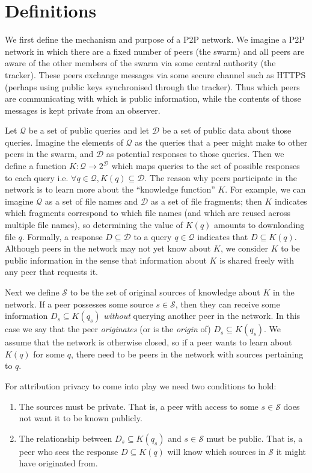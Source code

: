 \documentclass{article}
\begin{document}
\section{Definitions}\label{sec:defn}

We first define the mechanism and purpose of a P2P network. We imagine a P2P
network in which there are a fixed number of peers (the swarm) and all peers are
aware of the other members of the swarm via some central authority (the
tracker). These peers exchange messages via some secure channel such as HTTPS
(perhaps using public keys synchronised through the tracker). Thus which peers
are communicating with which is public information, while the contents of those
messages is kept private from an observer.

Let $\mathcal{Q}$ be a set of public queries and let $\mathcal{D}$ be a set of
public data about those queries. Imagine the elements of $\mathcal{Q}$ as the
queries that a peer might make to other peers in the swarm, and $\mathcal{D}$ as
potential responses to those queries. Then we define a function
$K:\mathcal{Q}\rightarrow 2^\mathcal{D}$ which maps queries to the set of
possible responses to each query i.e. $\forall q\in\mathcal{Q},
K(q)\subseteq\mathcal{D}$. The reason why peers participate in the network is to
learn more about the ``knowledge function'' $K$. For example, we can imagine
$\mathcal{Q}$ as a set of file names and $\mathcal{D}$ as a set of file
fragments; then $K$ indicates which fragments correspond to which file names
(and which are reused across multiple file names), so determining the value of
$K(q)$ amounts to downloading file $q$. Formally, a response
$D\subseteq\mathcal{D}$ to a query $q\in\mathcal{Q}$ indicates that $D\subseteq
K(q)$. Although peers in the network may not yet know about $K$, we consider $K$
to be public information in the sense that information about $K$ is shared
freely with any peer that requests it.

Next we define $\mathcal{S}$ to be the set of original sources of knowledge
about $K$ in the network. If a peer possesses some source $s\in\mathcal{S}$,
then they can receive some information $D_s\subseteq K(q_s)$ {\it without}
querying another peer in the network. In this case we say that the peer {\it
originates} (or is the {\it origin} of) $D_s\subseteq K(q_s)$. We assume that
the network is otherwise closed, so if a peer wants to learn about $K(q)$ for
some $q$, there need to be peers in the network with sources pertaining to $q$.

For attribution privacy to come into play we need two conditions to hold:
\begin{enumerate}
	\item The sources must be private. That is, a peer with access to some
		$s\in\mathcal{S}$ does not want it to be known publicly.
	\item The relationship between $D_s\subseteq K(q_s)$ and $s\in\mathcal{S}$
		must be public. That is, a peer who sees the response $D\subseteq K(q)$
		will know which sources in $\mathcal{S}$ it might have originated from.
\end{enumerate}
\end{document}
